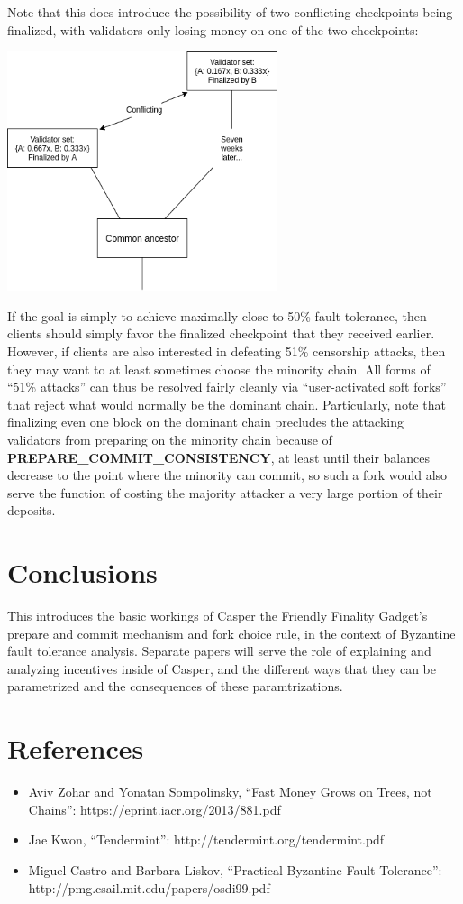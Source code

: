 \documentclass[12pt]{article}
\begin{document}
Note that this does introduce the possibility of two conflicting checkpoints being finalized, with validators only losing money on one of the two checkpoints:

\includegraphics[width=300px]{CommitsSync.png}

If the goal is simply to achieve maximally close to 50\% fault tolerance, then clients should simply favor the finalized checkpoint that they received earlier. However, if clients are also interested in defeating 51\% censorship attacks, then they may want to at least sometimes choose the minority chain. All forms of ``51\% attacks'' can thus be resolved fairly cleanly via ``user-activated soft forks'' that reject what would normally be the dominant chain. Particularly, note that finalizing even one block on the dominant chain precludes the attacking validators from preparing on the minority chain because of \textbf{PREPARE\_COMMIT\_CONSISTENCY}, at least until their balances decrease to the point where the minority can commit, so such a fork would also serve the function of costing the majority attacker a very large portion of their deposits.

\section{Conclusions}

This introduces the basic workings of Casper the Friendly Finality Gadget's prepare and commit mechanism and fork choice rule, in the context of Byzantine fault tolerance analysis. Separate papers will serve the role of explaining and analyzing incentives inside of Casper, and the different ways that they can be parametrized and the consequences of these paramtrizations.

\section{References}


\begin{itemize}
\item Aviv Zohar and Yonatan Sompolinsky, ``Fast Money Grows on Trees, not Chains'': https://eprint.iacr.org/2013/881.pdf
\item Jae Kwon, ``Tendermint'': http://tendermint.org/tendermint.pdf
\item Miguel Castro and Barbara Liskov, ``Practical Byzantine Fault Tolerance'': http://pmg.csail.mit.edu/papers/osdi99.pdf 
\end{itemize}
\end{document}
